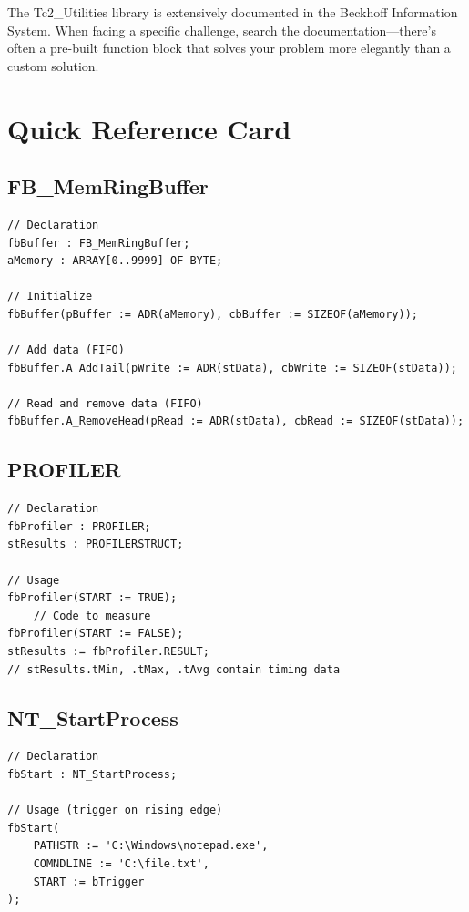 \documentclass[11pt,a4paper]{article}
\begin{document}
\begin{tipbox}
The Tc2\_Utilities library is extensively documented in the Beckhoff Information System. When facing a specific challenge, search the documentation---there's often a pre-built function block that solves your problem more elegantly than a custom solution.
\end{tipbox}

\section*{Quick Reference Card}

\subsection*{FB\_MemRingBuffer}

\begin{lstlisting}
// Declaration
fbBuffer : FB_MemRingBuffer;
aMemory : ARRAY[0..9999] OF BYTE;

// Initialize
fbBuffer(pBuffer := ADR(aMemory), cbBuffer := SIZEOF(aMemory));

// Add data (FIFO)
fbBuffer.A_AddTail(pWrite := ADR(stData), cbWrite := SIZEOF(stData));

// Read and remove data (FIFO)
fbBuffer.A_RemoveHead(pRead := ADR(stData), cbRead := SIZEOF(stData));
\end{lstlisting}

\subsection*{PROFILER}

\begin{lstlisting}
// Declaration
fbProfiler : PROFILER;
stResults : PROFILERSTRUCT;

// Usage
fbProfiler(START := TRUE);
    // Code to measure
fbProfiler(START := FALSE);
stResults := fbProfiler.RESULT;
// stResults.tMin, .tMax, .tAvg contain timing data
\end{lstlisting}

\subsection*{NT\_StartProcess}

\begin{lstlisting}
// Declaration
fbStart : NT_StartProcess;

// Usage (trigger on rising edge)
fbStart(
    PATHSTR := 'C:\Windows\notepad.exe',
    COMNDLINE := 'C:\file.txt',
    START := bTrigger
);
\end{lstlisting}
\end{document}
